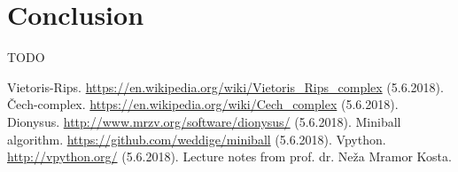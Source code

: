 \documentclass[a4paper, 12pt]{article}
\begin{document}
\section{Conclusion}
TODO


\begin{thebibliography}{99}
	\bibitem{} Vietoris-Rips. \url{https://en.wikipedia.org/wiki/Vietoris_Rips_complex} (5.6.2018).
	Čech-complex. \url{https://en.wikipedia.org/wiki/Cech_complex} (5.6.2018).
	Dionysus. \url{http://www.mrzv.org/software/dionysus/} (5.6.2018).
	Miniball algorithm. \url{https://github.com/weddige/miniball} (5.6.2018).
	Vpython. \url{http://vpython.org/} (5.6.2018).
	 Lecture notes from prof. dr. Neža Mramor Kosta.
\end{thebibliography}
\end{document}
